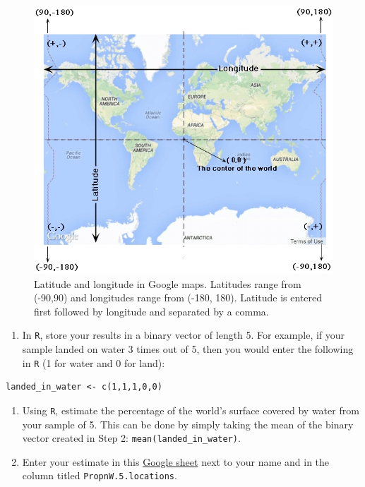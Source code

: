 \documentclass[letterpaper,9pt,twoside,printwatermark=false]{pinp}
\providecommand{\tightlist}{%
  \setlength{\itemsep}{0pt}\setlength{\parskip}{0pt}}
\begin{document}
\begin{figure}[H]
  \begin{center}
    \includegraphics[scale=0.40]{lat-long.png} 
  \end{center}
  \caption{Latitude and longitude in Google maps. Latitudes range from (-90,90) and longitudes range from (-180, 180). Latitude is entered first followed by longitude and separated by a comma.}\label{maps}
\end{figure}

\begin{enumerate}
\def\labelenumi{\arabic{enumi}.}
\setcounter{enumi}{1}
\tightlist
\item
  In \texttt{R}, store your results in a binary vector of length 5. For
  example, if your sample landed on water 3 times out of 5, then you
  would enter the following in \texttt{R} (1 for water and 0 for land):
\end{enumerate}

\begin{ShadedResult}
\begin{verbatim}
landed_in_water <- c(1,1,1,0,0)
\end{verbatim}
\end{ShadedResult}

\begin{enumerate}
\def\labelenumi{\arabic{enumi}.}
\setcounter{enumi}{2}
\item
  Using \texttt{R}, estimate the percentage of the world's surface
  covered by water from your sample of 5. This can be done by simply
  taking the mean of the binary vector created in Step 2:
  \texttt{mean(landed\_in\_water)}.
\item
  Enter your estimate in this
  \href{https://docs.google.com/spreadsheets/d/1Mnxeq9nQcTdQycZ7S_62fYFiNC5_a3fibsyodzfwO58/edit?usp=sharing}{Google
  sheet} next to your name and in the column titled
  \texttt{PropnW.5.locations}.
\end{enumerate}
\end{document}
